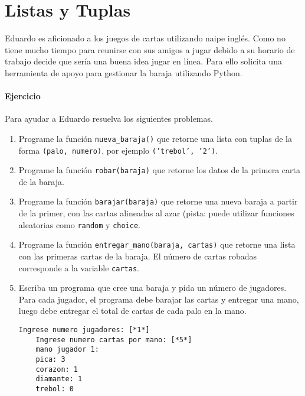 \section{Listas y Tuplas}

  Eduardo es aficionado a los juegos de cartas
  utilizando naipe inglés.
  Como no tiene mucho tiempo para reunirse con sus amigos
  a jugar debido a su horario de trabajo decide
  que sería una buena idea jugar en línea.
  Para ello solicita una herramienta de apoyo
  para gestionar la baraja utilizando Python.
  
  \paragraph{Ejercicio}
  Para ayudar a Eduardo resuelva los siguientes problemas.
  
  \begin{enumerate}
  \item
    Programe la función \texttt{nueva\_baraja()}
    que retorne una lista con tuplas de la forma
    \texttt{(palo, numero)},
    por ejemplo \texttt{('trebol', '2')}.
  \item
    Programe la función \texttt{robar(baraja)}
    que retorne los datos de la primera carta de la baraja.
  \item
    Programe la función \texttt{barajar(baraja)}
    que retorne una nueva baraja a partir de la primer,
    con las cartas alineadas al azar
    (pista: puede utilizar
    funciones aleatorias como \texttt{random} y \texttt{choice}.
  \item
    Programe la función \texttt{entregar\_mano(baraja, cartas)}
    que retorne una lista con las primeras cartas de la baraja.
    El número de cartas robadas corresponde a la variable \texttt{cartas}.
  \item
    Escriba un programa que cree una baraja y pida un número de jugadores.
    Para cada jugador,
    el programa debe barajar las cartas y entregar una mano,
    luego debe entregar el total de cartas de cada palo en la mano.
    
    \begin{lstlisting}[style=consola]
    Ingrese numero jugadores: [*1*]
    Ingrese numero cartas por mano: [*5*]
    mano jugador 1:
    pica: 3
    corazon: 1
    diamante: 1
    trebol: 0
    \end{lstlisting}
  \end{enumerate}